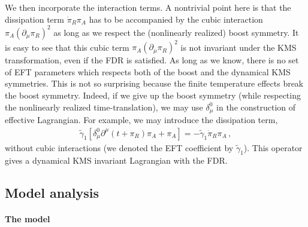 \documentclass[a4paper,11pt]{article}
\begin{document}
We then incorporate the interaction terms. A nontrivial point here is that the dissipation term $\dot{\pi}_R\pi_A$ has to be accompanied by the cubic interaction $\pi_A(\partial_\mu\pi_R)^2$ as long as we respect the (nonlinearly realized) boost symmetry. It is easy to see that this cubic term $\pi_A(\partial_\mu\pi_R)^2$ is not invariant under the KMS transformation, even if the FDR is satisfied. As long as we know, there is no set of EFT parameters which respects both of the boost and the dynamical KMS symmetries. This is not so surprising because the finite temperature effects break the boost symmetry. Indeed, if we give up the boost symmetry (while respecting the nonlinearly realized time-translation), we may use $\delta^0_\mu$ in the construction of effective Lagrangian. For example, we may introduce the dissipation term,
\begin{align}
\label{Lorentz_breaking_dissipation}
\widetilde{\gamma}_1\left[\delta^0_\mu\partial^\mu(t+\pi_R)\pi_A+\pi_A\right]=-\widetilde{\gamma}_1\dot{\pi}_R\pi_A\,,
\end{align}
without cubic interactions (we denoted the EFT coefficient by $\widetilde{\gamma}_1$). This operator gives a dynamical KMS invariant Lagrangian with the FDR.









\subsection{Model analysis}
\label{sec:ModelAnalysis}


\paragraph{The model}
\end{document}
